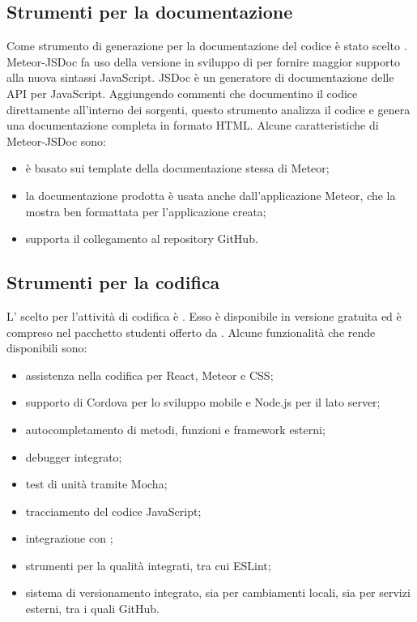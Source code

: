 \subsection{Strumenti per la documentazione}
Come strumento di generazione per la documentazione del codice è stato scelto \textbf{}.\\
Meteor-JSDoc fa uso della versione in sviluppo di \textbf{} per fornire maggior supporto alla nuova sintassi JavaScript.
JSDoc è un generatore di documentazione delle API per JavaScript. Aggiungendo commenti che documentino il codice direttamente all'interno dei sorgenti, questo strumento analizza il codice e genera una documentazione completa in formato HTML.
Alcune caratteristiche di Meteor-JSDoc sono:
\begin{itemize}
	\item è basato sui template della documentazione stessa di Meteor;
	\item la documentazione prodotta è usata anche dall'applicazione Meteor, che la mostra ben formattata per l'applicazione creata;
	\item supporta il collegamento al repository GitHub.
\end{itemize}

\subsection{Strumenti per la codifica}
L' scelto per l'attività di codifica è \textbf{}. Esso è disponibile in versione gratuita ed è compreso nel pacchetto studenti offerto da . Alcune funzionalità che rende disponibili sono:
\begin{itemize}
	\item assistenza nella codifica per React, Meteor e CSS;
	\item supporto di Cordova per lo sviluppo mobile e Node.js per il lato server;
	\item autocompletamento di metodi, funzioni e framework esterni;
	\item debugger integrato;
	\item test di unità tramite Mocha;
	\item tracciamento del codice JavaScript;
	\item integrazione con ;
	\item strumenti per la qualità integrati, tra cui ESLint;
	\item sistema di versionamento integrato, sia per cambiamenti locali, sia per servizi esterni, tra i quali GitHub.
\end{itemize}

